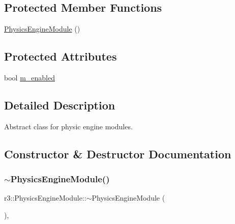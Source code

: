 \subsection*{Protected Member Functions}
\begin{DoxyCompactItemize}
\item 
\mbox{\hyperlink{classr3_1_1_physics_engine_module_a37f69469023611b549a09c2afc23df20}{Physics\+Engine\+Module}} ()
\end{DoxyCompactItemize}
\subsection*{Protected Attributes}
\begin{DoxyCompactItemize}
\item 
bool \mbox{\hyperlink{classr3_1_1_physics_engine_module_a9697a77e77dc5dd5990b16876ad413bf}{m\+\_\+enabled}}
\end{DoxyCompactItemize}


\subsection{Detailed Description}
Abstract class for physic engine modules. 

\subsection{Constructor \& Destructor Documentation}
\mbox{\label{classr3_1_1_physics_engine_module_af2b491daa564a15ec5362780c885e2ca}} 
\subsubsection{\texorpdfstring{$\sim$\+Physics\+Engine\+Module()}{~PhysicsEngineModule()}}
{\footnotesize\ttfamily r3\+::\+Physics\+Engine\+Module\+::$\sim$\+Physics\+Engine\+Module (\begin{DoxyParamCaption}{ }\end{DoxyParamCaption})\hspace{0.3cm}{\ttfamily [virtual]}, {\ttfamily [default]}}

\mbox{\label{classr3_1_1_physics_engine_module_a37f69469023611b549a09c2afc23df20}} 
